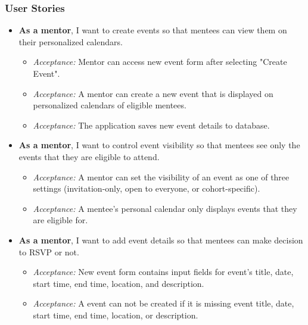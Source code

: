 \subsubsection{User Stories}
\begin{itemize}[leftmargin=*, label=$\square$]
    \item \textbf{As a mentor}, I want to create events so that mentees can view
    them on their personalized calendars.
    \begin{itemize}[label=$\circ$, nosep]
        \item \textit{Acceptance:} Mentor can access new event form after
        selecting "Create Event".
        \item \textit{Acceptance:} A mentor can create a new event that is
        displayed on personalized calendars of eligible mentees.
        \item \textit{Acceptance:} The application saves new event details to
        database.
    \end{itemize}

    \item \textbf{As a mentor}, I want to control event visibility so that
    mentees see only the events that they are eligible to attend.
    \begin{itemize}[label=$\circ$, nosep]
        \item \textit{Acceptance:} A mentor can set the visibility of an event
        as one of three settings (invitation-only, open to everyone, or
        cohort-specific).
        \item \textit{Acceptance:} A mentee's personal calendar only displays
        events that they are eligible for.
    \end{itemize}

    \item \textbf{As a mentor}, I want to add event details so that mentees can
    make decision to RSVP or not.
    \begin{itemize}[label=$\circ$, nosep]
        \item \textit{Acceptance:} New event form contains input fields for
        event's title, date, start time, end time, location, and description.
        \item \textit{Acceptance:} A event can not be created if it is missing
        event title, date, start time, end time, location, or description.
    \end{itemize}


\end{itemize}

